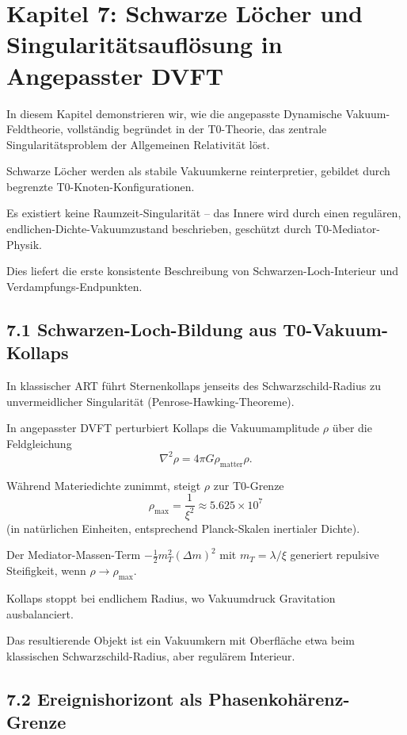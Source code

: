 \documentclass[12pt,a4paper]{article}
\begin{document}
	\section{Kapitel 7: Schwarze Löcher und Singularitätsauflösung in Angepasster DVFT}
	
	In diesem Kapitel demonstrieren wir, wie die angepasste Dynamische Vakuum-Feldtheorie, vollständig begründet in der T0-Theorie, das zentrale Singularitätsproblem der Allgemeinen Relativität löst.
	
	Schwarze Löcher werden als stabile Vakuumkerne reinterpretier, gebildet durch begrenzte T0-Knoten-Konfigurationen.
	
	Es existiert keine Raumzeit-Singularität – das Innere wird durch einen regulären, endlichen-Dichte-Vakuumzustand beschrieben, geschützt durch T0-Mediator-Physik.
	
	Dies liefert die erste konsistente Beschreibung von Schwarzen-Loch-Interieur und Verdampfungs-Endpunkten.
	
	\subsection{7.1 Schwarzen-Loch-Bildung aus T0-Vakuum-Kollaps}
	
	In klassischer ART führt Sternenkollaps jenseits des Schwarzschild-Radius zu unvermeidlicher Singularität (Penrose-Hawking-Theoreme).
	
	In angepasster DVFT perturbiert Kollaps die Vakuumamplitude $\rho$ über die Feldgleichung
	\[
	\nabla^2 \rho = 4\pi G \rho_{\text{matter}} \rho.
	\]
	
	Während Materiedichte zunimmt, steigt $\rho$ zur T0-Grenze
	\[
	\rho_{\text{max}} = \frac{1}{\xi^2} \approx 5.625 \times 10^7
	\]
	(in natürlichen Einheiten, entsprechend Planck-Skalen inertialer Dichte).
	
	Der Mediator-Massen-Term $-\frac{1}{2} m_T^2 (\Delta m)^2$ mit $m_T = \lambda / \xi$ generiert repulsive Steifigkeit, wenn $\rho \to \rho_{\text{max}}$.
	
	Kollaps stoppt bei endlichem Radius, wo Vakuumdruck Gravitation ausbalanciert.
	
	Das resultierende Objekt ist ein Vakuumkern mit Oberfläche etwa beim klassischen Schwarzschild-Radius, aber regulärem Interieur.
	
	\subsection{7.2 Ereignishorizont als Phasenkohärenz-Grenze}
	
\end{document}
